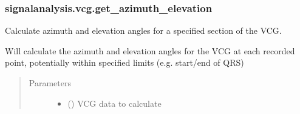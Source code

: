 \documentclass[letterpaper,10pt,english]{sphinxmanual}
\begin{document}
\subsubsection{signalanalysis.vcg.get\_azimuth\_elevation}
\label{\detokenize{_autosummary/signalanalysis.vcg.get_azimuth_elevation:signalanalysis-vcg-get-azimuth-elevation}}\label{\detokenize{_autosummary/signalanalysis.vcg.get_azimuth_elevation::doc}}

\begin{fulllineitems}
\label{\detokenize{_autosummary/signalanalysis.vcg.get_azimuth_elevation:signalanalysis.vcg.get_azimuth_elevation}}
\sphinxAtStartPar
Calculate azimuth and elevation angles for a specified section of the VCG.

\sphinxAtStartPar
Will calculate the azimuth and elevation angles for the VCG at each recorded point, potentially within specified
limits (e.g. start/end of QRS)
\begin{quote}\begin{description}
\item[{Parameters}] \leavevmode\begin{itemize}
\item {} 
\sphinxAtStartPar
{} () \textendash{} VCG data to calculate


\end{itemize}
\end{description}
\end{quote}
\end{fulllineitems}
\end{document}
